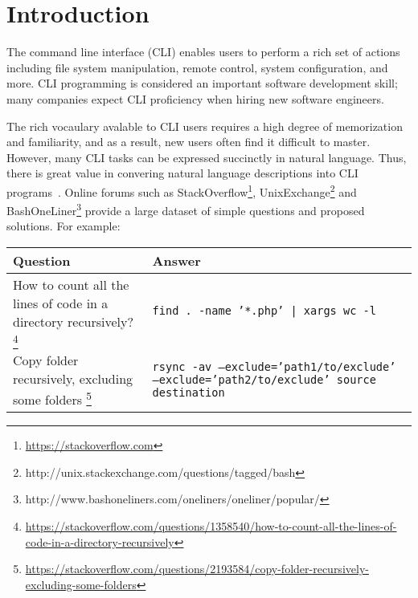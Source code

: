 \section{Introduction}


The command line interface (CLI) enables users to perform a rich set of actions including file system manipulation, remote control, system configuration, and more. CLI programming is considered an important software development skill; many companies expect CLI proficiency when hiring new software engineers.

The rich vocaulary avalable to CLI users requires a high degree of memorization and familiarity, and as a result, new users often find it difficult to master. However, many CLI tasks can be expressed succinctly in natural language. Thus, there is great value in convering natural language descriptions into CLI programs~\cite{Pederson-Report,Manaris:1994:DNL:198125.198137,ZOLTANFORD1991527}. Online forums such as StackOverflow\footnote{\url{https://stackoverflow.com}}, UnixExchange\footnote{http://unix.stackexchange.com/questions/tagged/bash} and BashOneLiner\footnote{http://www.bashoneliners.com/oneliners/oneliner/popular/} provide a large dataset of simple questions and proposed solutions. For example:

\begin{center}
\begin{tabular}{p{3in}p{3in}}
    \textbf{Question} & \textbf{Answer} \\
    \hline \hline
    How to count all the lines of code in a directory recursively?%
        \footnote{\url{https://stackoverflow.com/questions/1358540/how-to-count-all-the-lines-of-code-in-a-directory-recursively}} &
        \texttt{find . -name '*.php' | xargs wc -l} \\
    \hline
    Copy folder recursively, excluding some folders%
        \footnote{\url{https://stackoverflow.com/questions/2193584/copy-folder-recursively-excluding-some-folders}} &
        \texttt{rsync -av --exclude='path1/to/exclude' --exclude='path2/to/exclude' source destination} \\
\end{tabular}
\end{center}

